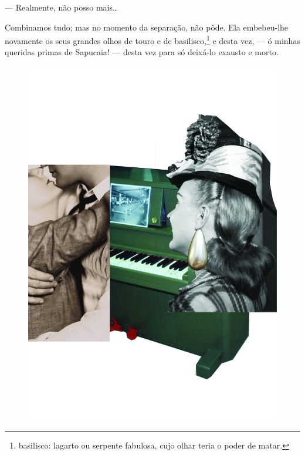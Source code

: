 --- Realmente, não posso mais\ldots{}

Combinamos tudo; mas no momento da separação, não pôde. Ela embebeu-lhe
novamente os seus grandes olhos de touro e de basilisco,\footnote{basilisco:
  lagarto ou serpente fabulosa, cujo olhar teria o poder de matar.} e
desta vez, --- ó minhas queridas primas de Sapucaia! --- desta vez para
só deixá-lo exausto e morto.

\pagebreak
\thispagestyle{empty}
\begin{figure}
\vspace*{-.5cm}
\hspace*{-2.3cm}\includegraphics[width=140mm]{../ilustracoes/11_BRINCOS.jpg}
\end{figure}
\pagebreak


